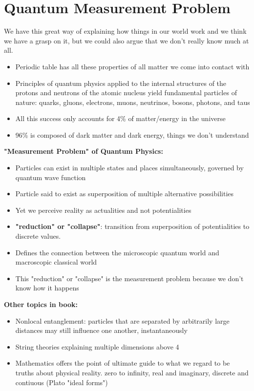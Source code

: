 \documentclass{article}
\begin{document}
\section{Quantum Measurement Problem}
We have this great way of explaining how things in our world work and we think we have a grasp on it, but we could also argue that we don't really know much at all.  

\begin{itemize}
    \item Periodic table has all these properties of all matter we come into contact with
    \item Principles of quantum physics applied to the internal structures of the protons and neutrons of the atomic nucleus yield fundamental particles of nature: quarks, gluons, electrons, muons, neutrinos, bosons, photons, and taus
    \item All this success only accounts for 4\% of matter/energy in the universe
    \item 96\% is composed of dark matter and dark energy, things we don't understand
\end{itemize}

\textbf{"Measurement Problem" of Quantum Physics:} 
\begin{itemize}
    \item Particles can exist in multiple states and places simultaneously, governed by quantum wave function
    \item Particle said to exist as superposition of multiple alternative possibilities
    \item Yet we perceive reality as actualities and not potentialities
    \item \textbf{"reduction" or "collapse"}: transition from superposition of potentialities to discrete values. 
    \item Defines the connection between the microscopic quantum world and macroscopic classical world
    \item This "reduction" or "collapse" is the measurement problem because we don't know how it happens 
\end{itemize}

\textbf{Other topics in book:}
\begin{itemize}
    \item Nonlocal entanglement: particles that are separated by arbitrarily large distances may still influence one another, instantaneously
    \item String theories explaining multiple dimensions above 4 
    \item Mathematics offers the point of ultimate guide to what we regard to be truths about physical reality. zero to infinity, real and imaginary, discrete and contiuous (Plato  "ideal forms") 
\end{itemize}
\end{document}
